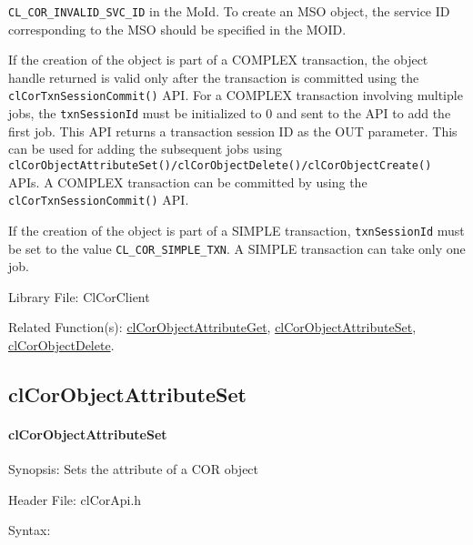 \begin{flushleft}
\begin{Desc}
{\tt{CL\_\-COR\_\-INVALID\_\-SVC\_\-ID}} in the MoId. To create an MSO object, the service ID corresponding to the MSO should be specified in the MOID. 
\par
If the creation of the object is part of a COMPLEX transaction, the object handle returned is valid only after the transaction is committed using the 
{\tt{clCorTxnSessionCommit()}} API. For a COMPLEX transaction involving multiple jobs, the {\tt{txnSessionId}} must be initialized to 0 and sent to the 
API to add the first job. This API returns a transaction session ID as the OUT parameter. This can be used for adding the subsequent jobs using 
{\tt{clCorObjectAttributeSet()/clCorObjectDelete()/clCorObjectCreate()}} APIs. A COMPLEX transaction can be committed by using the
{\tt{clCorTxnSessionCommit()}} API.
\par
If the creation of the object is part of a SIMPLE transaction, {\tt{txnSessionId}} must be set to the value {\tt{CL\_\-COR\_\-SIMPLE\_\-TXN}}. A SIMPLE 
transaction can take only one job.

\par
\end{Desc}
\begin{Desc}
\item[Library File:]Cl\-Cor\-Client\end{Desc}
\begin{Desc}
\item[Related Function(s):]\hyperlink{pagecor127}{cl\-Cor\-Object\-Attribute\-Get}, \hyperlink{pagecor101}{cl\-Cor\-Object\-Attribute\-Set}, 
\hyperlink{pagecor130}{cl\-Cor\-Object\-Delete}. \end{Desc}
\newpage


\subsection{clCorObjectAttributeSet}
\hypertarget{pagecor101}{}\paragraph{cl\-Cor\-Object\-Attribute\-Set}\label{pagecor101}
\begin{Desc}
\item[Synopsis:]Sets the attribute of a COR object\end{Desc}
\begin{Desc}
\item[Header File:]clCorApi.h\end{Desc}
\begin{Desc}
\item[Syntax:]


\end{Desc}
\end{flushleft}
